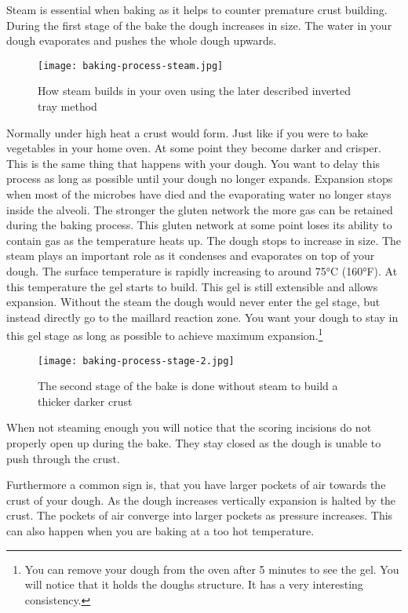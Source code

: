 Steam is essential when baking as it helps to counter premature
crust building. During the first stage of the bake the dough
increases in size. The water in your dough evaporates and pushes
the whole dough upwards. 

\begin{figure}[!htb]
  \texttt{[image: baking-process-steam.jpg]}
  \caption{How steam builds in your oven using the later described
  inverted tray method}
\end{figure}

Normally under high heat a crust would form. Just like
if you were to bake vegetables in your home oven. At some point
they become darker and crisper. This is the same thing that
happens with your dough. You want to delay this process
as long as possible until your dough no longer expands.
Expansion stops when most of the microbes have died and
the evaporating water no longer stays inside the alveoli.
The stronger the gluten network the more gas can be retained
during the baking process. This gluten network at some point
loses its ability to contain gas as the temperature heats
up. The dough stops to increase in size. The steam plays
an important role as it condenses and evaporates on top
of your dough. The surface temperature is rapidly increasing
to around 75°C (160°F). At this temperature the gel starts
to build. This gel is still extensible and allows expansion.
Without the steam the dough would never enter the gel stage,
but instead directly go to the maillard reaction zone. You
want your dough to stay in this gel stage as long as possible
to achieve maximum expansion.\footnote{You can remove your
dough from the oven after 5 minutes to see the gel. You will notice
that it holds the doughs structure. It has a very interesting consistency.}

\begin{figure}[!htb]
  \texttt{[image: baking-process-stage-2.jpg]}
  \caption{The second stage of the bake is done without steam to build
  a thicker darker crust}
\end{figure}

When not steaming enough you will notice that the scoring
incisions do not properly open up during the bake. They stay
closed as the dough is unable to push through the crust.

Furthermore a common sign is, that you have larger pockets
of air towards the crust of your dough. As the dough increases
vertically expansion is halted by the crust. The pockets
of air converge into larger pockets as pressure increases.
This can also happen when you are baking at a too hot temperature.

